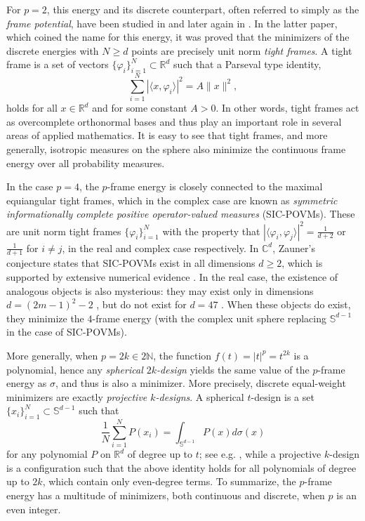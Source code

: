\documentclass[11pt, leqno]{amsart}
\def\C{\mathbb C}
\def\R{\mathbb R}
\def\S{\mathbb S}
\theoremstyle{definition}
\numberwithin{equation}{section}
\begin{document}
For $p=2$, this energy and  its discrete counterpart, often referred to simply as the {\em{frame potential}},  have been studied in \cite{sidel1974new} and later again in \cite{benedetto2003finite}. In the latter paper, which coined the name for this energy, it was proved that the minimizers of the discrete energies  with $N\ge d$ points  are precisely  unit norm {\em{tight frames}}. 
A tight frame  is a set of vectors $\{\varphi_{i}\}_{i=1}^N\subset \R^{d}$ such that a Parseval type identity, $$\sum\limits_{i=1}^N |\langle x,\varphi_{i} \rangle|^2=A \|x\|^2,$$ holds for all $x\in\R^d$ and for some constant $A>0$. In other words, tight frames   act as overcomplete orthonormal bases and thus play an important role in several areas of applied mathematics. 
 It is easy to see that tight frames, and more generally, isotropic measures on the sphere also minimize the continuous frame energy over all probability measures. 
 
 In the case $p=4$, the $p$-frame energy is closely connected to the maximal equiangular tight frames, which in the complex case are  known as {\em symmetric informationally complete positive operator-valued measures} (SIC-POVMs). 
These are unit norm tight frames $\{ \varphi_i\}_{i=1}^N $ with the property that $|\langle \varphi_i, \varphi_j \rangle |^2 = \frac{1}{d+2}$ or $\frac{1}{d+1}$ for $i\neq j$, in the real and complex case respectively.  In $\C^d$, Zauner's conjecture \cite{zau99} states that SIC-POVMs exist in all dimensions $d\ge 2$, which is supported by extensive numerical evidence \cite{SG,RBSC}. In the real case, the existence of analogous objects is also mysterious: they may exist only in dimensions $d=(2m-1)^2-2$ \cite{LS}, but do not exist for $d=47$ \cite{makhnev}. When these objects do exist, they minimize the $4$-frame energy (with the complex unit sphere replacing $\S^{d-1}$ in the case of SIC-POVMs). 

 
 
 
 More generally, when $p = 2k \in 2 \mathbb N$, the function $f(t) = |t|^p = t^{2k}$ is a polynomial, hence any {\em{spherical $2k$-design}} yields the same value of the $p$-frame energy as $\sigma$, and thus is also a minimizer.  More precisely,  discrete equal-weight minimizers are exactly  {\em{projective $k$-designs}}.
 A spherical $t$-design is a set $\{ x_i\}_{i=1}^N \subset \S^{d-1}$   such that $$ \frac{1}{N} \sum_{i=1}^N P(x_i)  = \int_{\S^{d-1}} P(x) d\sigma  (x) $$ for any polynomial $P$ on $\R^d$ of degree up to $t$; see e.g. \cite{delsarteSpherical1977}, while a  projective $k$-design is a configuration such that the above identity holds  for all polynomials of degree up to $2k$, which contain only even-degree terms. To summarize, the $p$-frame energy has  a multitude of minimizers, both continuous and discrete,  when $p$ is an even integer.  
 
\end{document}
